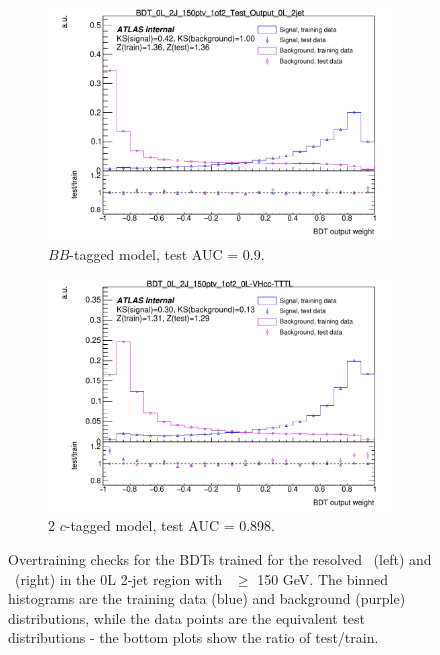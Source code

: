 \begin{figure}[h!]
    \hspace{-0.3cm}
    \begin{subfigure}[b]{0.49\textwidth}
        \centering
      \includegraphics[width=\textwidth]{Images/VH/Discriminants/OvertrainCheck_BDT_0L_2J_150ptv_1of2_Test_Output_0L_2jet.pdf}
    \caption{$BB$-tagged model, test AUC = 0.9.} 
    \end{subfigure}
    \begin{subfigure}[b]{0.49\textwidth}
        \centering
      \includegraphics[width=\textwidth]{Images/VH/Discriminants/OvertrainCheck_BDT_0L_2J_150ptv_1of2_0L-VHcc-TTTL.pdf}
      \caption{2 $c$-tagged model, test AUC = 0.898.}
    \end{subfigure}
    \caption{Overtraining checks for the BDTs trained for the resolved \vhb\ (left) and \vhc\ (right) in the 0L 2-jet region with \ptv\ $\geq$ 150 GeV. The binned histograms are the training data (blue) and background (purple) distributions, while the data points are the equivalent test distributions - the bottom plots show the ratio of test/train.}
    \label{fig:overtrainingCheck}
\end{figure} 

